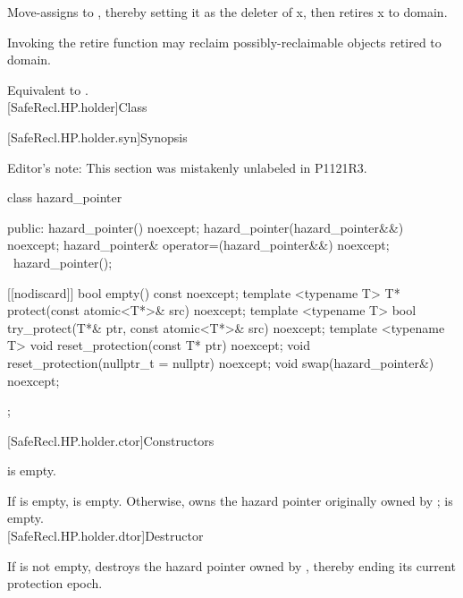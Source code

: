 \pnum
\effects Move-assigns  to , thereby setting it as the deleter of x, then retires x
to domain.

\pnum
Invoking the retire function may reclaim possibly-reclaimable objects retired to domain.
\\


\pnum
\effects Equivalent to .
\\

[SafeRecl.HP.holder]{Class }

[SafeRecl.HP.holder.syn]{Synopsis}

Editor's note: This section was mistakenly unlabeled in P1121R3.

\begin{codeblock}
class hazard_pointer {
public:
  hazard_pointer() noexcept;
  hazard_pointer(hazard_pointer&&) noexcept;
  hazard_pointer& operator=(hazard_pointer&&) noexcept;
  ~hazard_pointer();
  
  [[nodiscard]] bool empty() const noexcept;
  template <typename T> T* protect(const atomic<T*>& src) noexcept;  
  template <typename T> bool try_protect(T*& ptr, const atomic<T*>& src) noexcept;
  template <typename T> void reset_protection(const T* ptr) noexcept;
  void reset_protection(nullptr_t = nullptr) noexcept;
  void swap(hazard_pointer&) noexcept;
};
\end{codeblock}

[SafeRecl.HP.holder.ctor]{Constructors}


\pnum
\postconditions {} is empty.
\\


\pnum
\postconditions If  is empty,  is empty. Otherwise,  owns the hazard pointer originally owned by ;  is empty.
\\

[SafeRecl.HP.holder.dtor]{Destructor}


\pnum
\effects If  is not empty, destroys the hazard pointer owned by , thereby ending its current protection epoch.
\\

